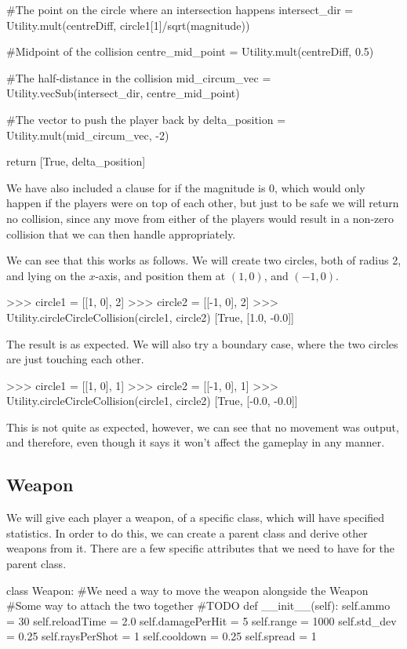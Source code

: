 \begin{mpy}
        #The point on the circle where an intersection happens
        intersect_dir = Utility.mult(centreDiff, circle1[1]/sqrt(magnitude))

        #Midpoint of the collision
        centre_mid_point = Utility.mult(centreDiff, 0.5)

        #The half-distance in the collision
        mid_circum_vec = Utility.vecSub(intersect_dir, centre_mid_point)

        #The vector to push the player back by
        delta_position = Utility.mult(mid_circum_vec, -2)

        return [True, delta_position]
\end{mpy}

We have also included a clause for if the magnitude is 0, which would only happen if the players were on top of each other, but just to be safe we will return no collision, since any move from either of the players would result in a non-zero collision that we can then handle appropriately.

\vs
We can see that this works as follows. We will create two circles, both of radius 2, and lying on the $x$-axis, and position them at $(1, 0)$, and $(-1, 0)$.

\begin{mpy}
>>> circle1 = [[1, 0], 2]
>>> circle2 = [[-1, 0], 2]
>>> Utility.circleCircleCollision(circle1, circle2)
[True, [1.0, -0.0]]
\end{mpy}

The result is as expected. We will also try a boundary case, where the two circles are just touching each other.

\begin{mpy}
>>> circle1 = [[1, 0], 1]
>>> circle2 = [[-1, 0], 1]
>>> Utility.circleCircleCollision(circle1, circle2)
[True, [-0.0, -0.0]]
\end{mpy}

This is not quite as expected, however, we can see that no movement was output, and therefore, even though it says  it won't affect the gameplay in any manner.


\subsection{Weapon}
We will give each player a weapon, of a specific class, which will have specified statistics. In order to do this, we can create a parent class  and derive other weapons from it. There are a few specific attributes that we need to have for the parent class. 
\vs
\begin{mpy}
class Weapon:
    #We need a way to move the weapon alongside the Weapon
    #Some way to attach the two together
    #TODO
    def __init__(self):
        self.ammo = 30
        self.reloadTime = 2.0
        self.damagePerHit = 5
        self.range = 1000
        self.std_dev = 0.25
        self.raysPerShot = 1
        self.cooldown = 0.25
        self.spread = 1
\end{mpy}

